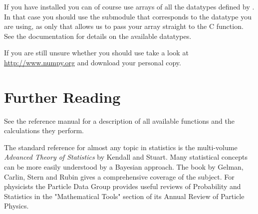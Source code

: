 If you have installed \numpy{} you can of course use arrays of all the
datatypes defined by \numpy{}. In that case you should use the submodule that
corresponds to the \numpy{} datatype you are using, as only that allows us to
pass your \numpy{} array straight to the C function. See the \numpy{}
documentation for details on the available datatypes.

\begin{seealso}
   If you are still unsure whether you should use \numpy{} take a look at
   \url{http://www.numpy.org} and download your personal copy.
\end{seealso}



\section{Further Reading}
\label{sec:stat:further-reading}

See the \gsl{} reference manual for a description of all available functions
and the calculations they perform.

The standard reference for almost any topic in statistics is the multi-volume
\emph{Advanced Theory of Statistics} by Kendall and Stuart.  Many statistical
concepts can be more easily understood by a Bayesian approach.  The book by
Gelman, Carlin, Stern and Rubin gives a comprehensive coverage of the subject.
For physicists the Particle Data Group provides useful reviews of Probability
and Statistics in the "Mathematical Tools" section of its Annual Review of
Particle Physics.
   
\begin{seealso}
   
   
   
   
   
\end{seealso}


